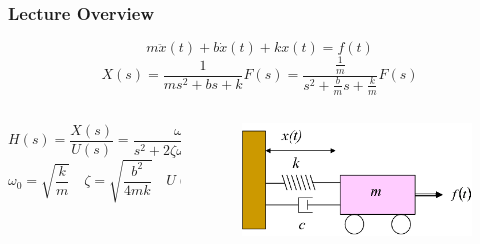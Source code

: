 \documentclass[aspectratio=169]{beamer}
\begin{document}
\begin{frame}
	\frametitle{Lecture Overview}
	\[
		m \ddot{x}(t) + b \dot{x}(t) + k x(t) = f(t)
	\]
	\[
		X(s) = \frac{1}{m s^2 + b s + k} F(s) 
		= \frac{\frac{1}{m}}{s^2 + \frac{b}{m} s + \frac{k}{m}} F(s)
	\]
	\begin{columns}
		\begin{column}{0.5\textwidth}
			\[
				H(s) = \frac{X(s)}{U(s)}
				= \frac{
					\omega_0^2
				}{
					s^2 + 2 \zeta \omega_0 s + \omega_0^2
				}
			\]		
	\[
		\omega_0 = \sqrt{\frac{k}{m}}
		\quad
		\zeta = \sqrt{\frac{b^2}{4 m k}}
		\quad
		U(s) = \frac{1}{k} F(s)
	\]
		\end{column}
		\begin{column}{0.25 \textwidth}
			\begin{figure}[]
				\includegraphics[width=\textwidth]{Images/SpringMassDamper_cartSystem.png}
			\end{figure}
		\end{column}
	\end{columns}
\end{frame}
\end{document}
